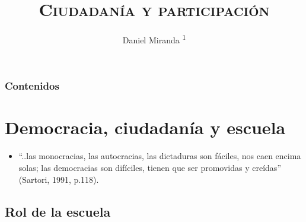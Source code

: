 \documentclass[]{beamer} %
\title[Psicología UDD: Ciudadanía y Participación] %
{\textsc{\large{Ciudadanía y participación}}}
\author[Daniel Miranda] %
{{{\small Daniel Miranda \textsuperscript{1}}}}
\institute{\textsuperscript{1}
	Pontificia Universidad Católica de Chile \\
	Facultad de Ciencias Sociales \\ 
	Centro de Medición MIDE UC \\  
	
	}
\date {\begin{tiny}
		{Mayo 25, 2021} %
	\end{tiny}}
\begin{document}

\begin{frame}[plain,label=firstframe] %
  \titlepage
\end{frame}



\begin{frame}
	\frametitle{Contenidos}
	\tableofcontents
\end{frame}

\section{Democracia, ciudadanía y escuela} 

\begin{frame} [allowframebreaks]
	\begin{itemize}
		\item  “..las monocracias, las autocracias, las dictaduras son fáciles, nos caen encima solas; las democracias son difíciles, tienen que ser promovidas y creídas” (Sartori, 1991, p.118).
	\end{itemize}
\end{frame}
	
	
\subsection{Rol de la escuela}
	
\end{document}
